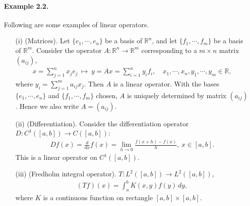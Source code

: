 \documentclass{article}
\begin{document}
\paragraph{Example 2.2.\label{example:2.2}} Following are some examples of linear operators.
\begin{itemize}
\item[(i)] (Matrices). Let $\{e_1,\cdots,e_n\}$ be a basis of $\mathbb{R}^n$, and let $\{f_1,\cdots,f_m\}$ be a basis of $\mathbb{R}^m$. Consider the operator $A:\mathbb{R}^n\to\mathbb{R}^m$ corresponding to a $m\times n$ matrix $(a_{ij})$,
\begin{align*}
	x=\sum_{j=1}^n x_je_j\ \mapsto\ y= Ax = \sum_{i=1}^n y_if_i,\quad  x_1,\cdots,x_n,y_1,\cdots,y_m\in\mathbb{R},
\end{align*}
where $y_i=\sum_{j=1}^m a_{ij}x_j$. Then $A$ is a linear operator. With the bases $\{e_1,\cdots,e_n\}$ and $\{f_1,\cdots,f_m\}$ chosen, $A$ is uniquely determined by matrix $(a_{ij})$. Hence we also write $A=(a_{ij})$.
\vspace{0.1cm}
\item[(ii)] (Differentiation). Consider the differentiation operator $D:C^1([a,b])\to C([a,b])$:
\begin{align*}
	Df(x)=\frac{d}{dx}f(x) = \lim_{h\to 0}\frac{f(x+h)-f(x)}{h},\ x\in[a,b].
\end{align*}
This is a linear operator on $C^1([a,b])$.
\vspace{0.1cm}
\item[(iii)] (Fredholm integral operator). $T:L^2([a,b])\to L^2([a,b])$,
\begin{align*}
	(Tf)(x) = \int_a^b K(x,y)f(y)\,dy,
\end{align*}
where $K$ is a continuous function on rectangle $[a,b]\times[a,b]$.
\vspace{0.1cm}
\end{itemize}
\end{document}
